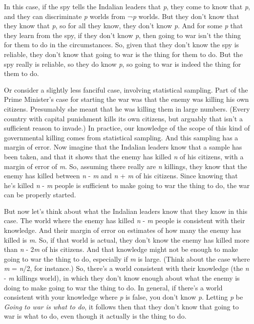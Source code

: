 \documentclass[
  11pt,
  letterpaper,
  DIV=11,
  numbers=noendperiod,
  twoside]{scrartcl}
\begin{document}
In this case, if the spy tells the Indalian leaders that \emph{p}, they
come to know that \emph{p}, and they can discriminate \emph{p} worlds
from ¬\emph{p} worlds. But they don't know that they know that \emph{p},
so for all they know, they don't know \emph{p}. And for some \emph{p}
that they learn from the spy, if they don't know \emph{p}, then going to
war isn't the thing for them to do in the circumstances. So, given that
they don't know the spy is reliable, they don't know that going to war
is the thing for them to do. But the spy really is reliable, so they do
know \emph{p}, so going to war is indeed the thing for them to do.

Or consider a slightly less fanciful case, involving statistical
sampling. Part of the Prime Minister's case for starting the war was
that the enemy was killing his own citizens. Presumably she meant that
he was killing them in large numbers. (Every country with capital
punishment kills its own citizens, but arguably that isn't a sufficient
reason to invade.) In practice, our knowledge of the scope of this kind
of governmental killing comes from statistical sampling. And this
sampling has a margin of error. Now imagine that the Indalian leaders
know that a sample has been taken, and that it shows that the enemy has
killed \emph{n} of his citizens, with a margin of error of \emph{m}. So,
assuming there really are \emph{n} killings, they know that the enemy
has killed between \emph{n} - \emph{m} and \emph{n} + \emph{m} of his
citizens. Since knowing that he's killed \emph{n} - \emph{m} people is
sufficient to make going to war the thing to do, the war can be properly
started.

But now let's think about what the Indalian leaders know that they know
in this case. The world where the enemy has killed \emph{n} - \emph{m}
people is consistent with their knowledge. And their margin of error on
estimates of how many the enemy has killed is \emph{m}. So, if that
world is actual, they don't know the enemy has killed more than \emph{n}
- 2\emph{m} of his citizens. And that knowledge might not be enough to
make going to war the thing to do, especially if \emph{m} is large.
(Think about the case where \emph{m} = \emph{n}/2, for instance.) So,
there's a world consistent with their knowledge (the \emph{n} - \emph{m}
killings world), in which they don't know enough about what the enemy is
doing to make going to war the thing to do. In general, if there's a
world consistent with your knowledge where \emph{p} is false, you don't
know \emph{p}. Letting \emph{p} be \emph{Going to war is what to do}, it
follows then that they don't know that going to war is what to do, even
though it actually is the thing to do.
\end{document}
